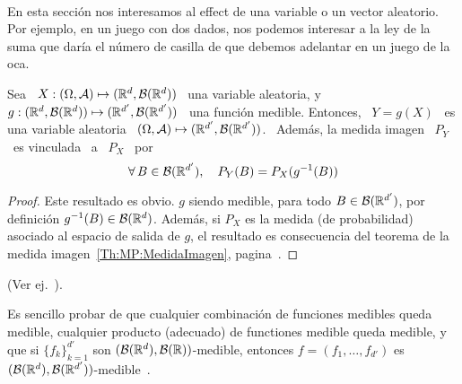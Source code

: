 \




\label{sec:MP:Transformacion}

En  esta  secci\'on nos  interesamos  al  effect de  una  variable  o un  vector
aleatorio. Por  ejemplo, en un juego con  dos dados, nos podemos  interesar a la
ley de la suma que dar\'ia el n\'umero de casilla de que debemos adelantar en un
juego de la oca.
%
\begin{teorema}
  Sea  \  $X:  (\Omega,\mathcal{A})  \mapsto  (\mathbb{R}^d ,  \mathcal{B}(\mathbb{R}^d))$  \  una  variable
  aleatoria,   y  \   $g:  (\mathbb{R}^d   ,  \mathcal{B}(\mathbb{R}^d))   \mapsto   (\mathbb{R}^{d'}  ,
  \mathcal{B}(\mathbb{R}^{d'}))$ \  una funci\'on  medible. Entonces,  \ $Y =  g(X)$ \  es una
  variable aleatoria  \ $(\Omega,\mathcal{A})  \mapsto (\mathbb{R}^{d'} ,  \mathcal{B}(\mathbb{R}^{d'}))$. \
  Adem\'as, la medida imagen \ $P_Y$ \ es vinculada \ a \ $P_X$ \ por
  \[
  \forall \, B \in \mathcal{B}(\mathbb{R}^{d'}), \quad P_Y(B) = P_X(g^{-1}(B))
  \]
\end{teorema}
%
\begin{proof}
  Este resultado es obvio. $g$ siendo medible, para todo $B \in \mathcal{B}(\mathbb{R}^{d'})$,
  por definici\'on $g^{-1}(B) \in \mathcal{B}(\mathbb{R}^d)$.  Adem\'as, si $P_X$ es la medida
  (de  probabilidad) asociado  al  espacio de  salida  de $g$,  el resultado  es
  consecuencia  del   teorema  de  la   medida  imagen~\ref{Th:MP:MedidaImagen},
  pagina~\pageref{Th:MP:MedidaImagen}.
\end{proof}
%
\noindent (Ver ej.~\cite{JacPro03, AthLah06, Bog07:v2, Coh13}).


Es sencillo  probar de que  cualquier combinaci\'on de funciones  medibles queda
medible, cualquier  producto (adecuado) de  functiones medible queda  medible, y
que si $\{ f_k \}_{k=1}^{d'}$ son $(\mathcal{B}(\mathbb{R}^d),\mathcal{B}(\mathbb{R}))$-medible, entonces $f
=          (f_1         ,          \ldots         ,          f_{d'})$         es
$(\mathcal{B}(\mathbb{R}^d),\mathcal{B}(\mathbb{R}^{d'}))$-medible~\cite{AthLah06}.



